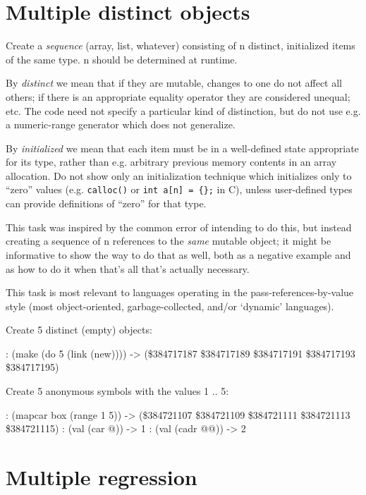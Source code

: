 \pagebreak{}
\section*{Multiple distinct objects}


Create a \emph{sequence} (array, list, whatever)
consisting of n distinct, initialized items of the same type. n should
be determined at runtime.

By \emph{distinct} we mean that if they are mutable, changes to one do
not affect all others; if there is an appropriate equality operator they
are considered unequal; etc. The code need not specify a particular kind
of distinction, but do not use e.g. a numeric-range generator which does
not generalize.

By \emph{initialized} we mean that each item must be in a well-defined
state appropriate for its type, rather than e.g. arbitrary previous
memory contents in an array allocation. Do not show only an
initialization technique which initializes only to ``zero'' values (e.g.
\texttt{calloc()} or \texttt{int a{[}n{]} = \{\};} in C), unless
user-defined types can provide definitions of ``zero'' for that type.

This task was inspired by the common error of intending to do this, but
instead creating a sequence of n references to the \emph{same} mutable
object; it might be informative to show the way to do that as well, both
as a negative example and as how to do it when that's all that's
actually necessary.

This task is most relevant to languages operating in the
pass-references-by-value style (most object-oriented, garbage-collected,
and/or `dynamic' languages).



\begin{wideverbatim}

Create 5 distinct (empty) objects:

: (make (do 5 (link (new))))
-> (\$384717187 \$384717189 \$384717191 \$384717193 \$384717195)

Create 5 anonymous symbols with the values 1 .. 5:

: (mapcar box (range 1 5))
-> (\$384721107 \$384721109 \$384721111 \$384721113 \$384721115)
: (val (car @))
-> 1
: (val (cadr @@))
-> 2

\end{wideverbatim}

\pagebreak{}
\section*{Multiple regression}


